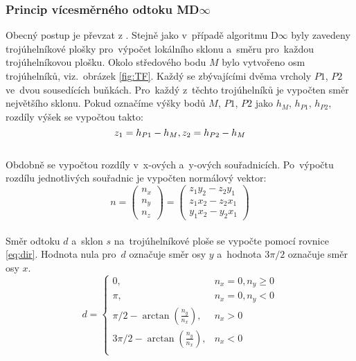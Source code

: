 \subsubsection{Princip vícesměrného odtoku MD\texorpdfstring{$\infty$}{infty}} \label{subsection:MD}
Obecný postup je převzat z \cite{seibert}. Stejně jako v~případě algoritmu D$\infty$ byly zavedeny trojúhelníkové plošky pro~výpočet lokálního sklonu a~směru pro~každou trojúhelníkovou plošku.
Okolo středového bodu $M$ bylo vytvořeno osm trojúhelníků, viz.~obrázek \ref{fig:TF}. Každý se zbývajícími dvěma vrcholy $P1$, $P2$ ve~dvou sousedících buňkách. 
Pro~každý z~těchto trojúhelníků je vypočten směr největšího sklonu. Pokud označíme výšky bodů $M$, $P1$, $P2$ jako $h_M$, $h_{P1}$, $h_{P2}$, rozdíly výšek se vypočtou takto:
\begin{equation}
z_1 = h_{P1} - h_M \\
, z_2 = h_{P2} - h_M \\ 
\end{equation} \\[0.2cm]
Obdobně se vypočtou rozdíly v~x-ových a~y-ových souřadnicích. Po~výpočtu rozdílu jednotlivých souřadnic je vypočten normálový vektor: \\
\begin{equation}
n = \left( \begin{array}{c}
n_x \\
n_y \\
n_z \end{array} \right)
= \left( \begin{array}{c}
z_1y_2 - z_2y_1 \\
z_1x_2 - z_2x_1 \\
y_1x_2 - y_2x_1 \end{array} \right) \label{eq:vektor} 
\end{equation} \\[0.2cm] 
Směr odtoku $d$ a~sklon $s$ na~trojúhelníkové ploše se vypočte pomocí rovnice \ref{eq:dir}. Hodnota nula pro~$d$ označuje směr osy $y$ a~hodnota $3\pi/2$ označuje směr osy $x$.
\begin{equation}
  d = \begin{cases} 0, & n_x = 0, n_y \geq 0 \\ \label{eq:dir}
  \pi, & n_x = 0, n_y < 0 \\
  \pi/2 - \arctan\left( \frac{n_y}{n_x} \right), & n_x > 0 \\
  3\pi/2 - \arctan\left( \frac{n_y}{n_x}\right), & n_x < 0 \\
  \end{cases} 
\end{equation} \\[0.3cm]
